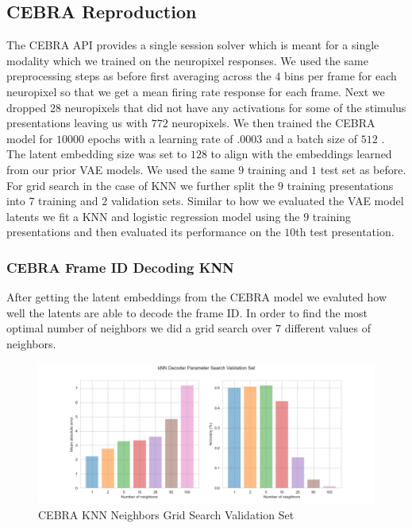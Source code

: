 \documentclass[12pt, letterpaper]{article}
\begin{document}
\subsection{CEBRA Reproduction}
\label{subsec:cebra_reproduction}
The CEBRA API \cite{cebra_demo} provides a single session solver which is meant for a single modality which we trained on the neuropixel responses. We used the same preprocessing steps as before first averaging across the $4$ bins per frame for each neuropixel so that we get a mean firing rate response for each frame. Next we dropped $28$ neuropixels that did not have any activations for some of the stimulus presentations leaving us with $772$ neuropixels. We then trained the CEBRA \cite{schneider2023} model for $10000$ epochs with a learning rate of $.0003$ and a batch size of $512$ \cite{cebra_demo}. The latent embedding size was set to $128$ to align with the embeddings learned from our prior VAE models. We used the same $9$ training and $1$ test set as before. For grid search in the case of KNN we further split the $9$ training presentations into $7$ training and $2$ validation sets. Similar to how we evaluated the VAE model latents we fit a KNN and logistic regression model using the $9$ training presentations and then evaluated its performance on the $10$th test presentation.

\subsubsection{CEBRA Frame ID Decoding KNN}
\label{subsubsec:cebra_frame_id_decoding_knn}
After getting the latent embeddings from the CEBRA \cite{schneider2023} model we evaluted how well the latents are able to decode the frame ID. In order to find the most optimal number of neighbors we did a grid search over $7$ different values of neighbors. 

\begin{figure}[H]
    \centering
    \includegraphics[width=1.0\textwidth]{cebra_latents_knn_decoder_grid_search.png}
    \caption{CEBRA KNN Neighbors Grid Search Validation Set}
    \label{fig:cebra_knn_frame_id_accuracy_mae}
\end{figure}
\end{document}
